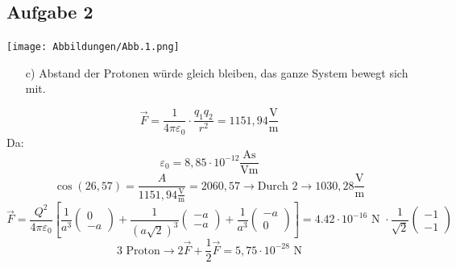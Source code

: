 \documentclass{article}
\begin{document}
\subsection*{Aufgabe 2}
\begin{center}
    \texttt{[image: Abbildungen/Abb.1.png]}
\end{center}
\begin{itemize}
    \item[c)] Abstand der Protonen würde gleich bleiben, das ganze System bewegt sich mit.
\end{itemize}
\begin{equation*}
    \vec{F} = \frac{1}{4\pi \varepsilon_0}\cdot\frac{q_1q_2}{r^2} = 1151,94 \mathrm{\frac{V}{m}} 
\end{equation*}
Da:
\begin{equation*}
    \varepsilon_0 = 8,85 \cdot 10^{-12} \mathrm{\frac{As}{Vm}}
\end{equation*}
\begin{equation*}
    \cos(26,57) = \frac{A}{1151,94 \mathrm{\frac{V}{m}}} = 2060,57 \rightarrow \text{Durch 2} \rightarrow 1030,28 \mathrm{\frac{V}{m}}
\end{equation*}
\begin{equation*}
    \vec{F}=\frac{Q^2}{4\pi \varepsilon_0} \left[\frac{1}{a^3}\left(\begin{array}{c}0\\-a\end{array}\right)+\frac{1}{(a\sqrt{2})^3}\left(\begin{array}{c}-a\\-a\end{array}\right)+\frac{1}{a^3}\left(\begin{array}{c}-a\\0\end{array}\right)\right] = 4.42 \cdot 10^{-16} \text{ N } \cdot \frac{1}{\sqrt{2}}\left(\begin{array}{c}-1\\-1\end{array}\right)
\end{equation*}
\begin{equation*}
    \text{3 Proton} \rightarrow 2\vec{F}+\frac{1}{2}\vec{F}=5,75 \cdot 10^{-28} \text{ N}
\end{equation*}
\end{document}

